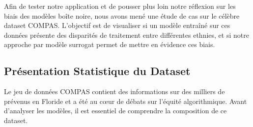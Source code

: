 \documentclass{article}
\begin{document}
\quad Afin de tester notre application et de pousser plus loin notre réflexion sur les biais des modèles boîte noire, nous avons mené une étude de cas sur le célèbre dataset COMPAS. L'objectif est de visualiser si un modèle entraîné sur ces données présente des disparités de traitement entre différentes ethnies, et si notre approche par modèle surrogat permet de mettre en évidence ces biais.

\subsection{Présentation Statistique du Dataset}

\quad Le jeu de données COMPAS contient des informations sur des milliers de prévenus en Floride et a été au cœur de débats sur l'équité algorithmique. Avant d'analyser les modèles, il est essentiel de comprendre la composition de ce dataset.
\end{document}
